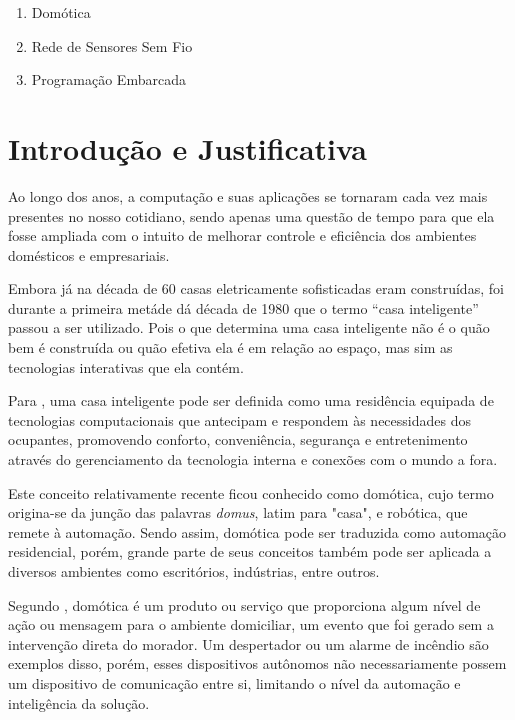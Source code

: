 \documentclass[
    12pt,               %
    a4paper,            %
    english,            %
    brazil,             %
    ]{article}
\begin{document}
        \begin{enumerate}
            \item Domótica
			\item Rede de Sensores Sem Fio
			\item Programação Embarcada
        \end{enumerate}


\section{Introdução e Justificativa}
Ao longo dos anos, a computação e suas aplicações se tornaram cada vez mais presentes no nosso cotidiano, sendo apenas uma questão
de tempo para que ela fosse ampliada com o intuito de melhorar controle e eficiência dos ambientes domésticos e empresariais.

Embora já na década de 60 casas eletricamente sofisticadas eram construídas, foi durante a primeira metáde dá década de 1980 que o
termo  ``casa inteligente'' passou a ser utilizado. Pois o que determina uma casa inteligente não é o quão bem é construída ou
quão efetiva ela é em relação ao espaço, mas sim as tecnologias interativas que ela contém. \cite{harper2003}

Para , uma casa inteligente pode ser definida como uma residência equipada de tecnologias computacionais
que antecipam e respondem às necessidades dos ocupantes, promovendo conforto, conveniência, segurança e entretenimento através do
gerenciamento da tecnologia interna e conexões com o mundo a fora.

Este conceito relativamente recente ficou conhecido como domótica, cujo termo origina-se da junção das palavras \textit{domus},
latim para "casa", e robótica, que remete à automação. Sendo assim, domótica pode ser traduzida como automação residencial, porém,
grande parte de seus conceitos também pode ser aplicada a diversos ambientes como escritórios, indústrias, entre outros.

Segundo , domótica é um produto ou serviço que proporciona algum nível de ação ou mensagem para o ambiente
domiciliar, um evento que foi gerado sem a intervenção direta do morador. Um despertador ou um alarme de incêndio são exemplos
disso, porém, esses dispositivos autônomos não necessariamente possem um dispositivo de comunicação entre si, limitando o nível da
automação e inteligência da solução.
\end{document}
